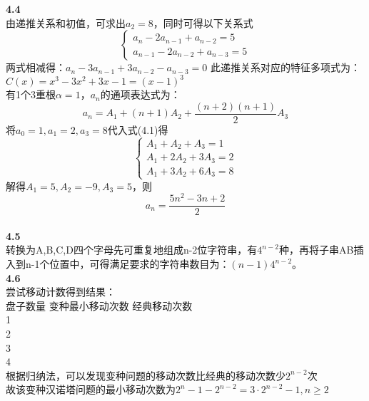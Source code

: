 \documentclass[a4paper,12pt]{article}
\begin{document}
	\noindent
	\textbf{4.4}\\
	由递推关系和初值，可求出$a_2=8$，同时可得以下关系式\\
	$$
	\begin{cases}
		a_{n}-2a_{n-1}+a_{n-2}=5\\
		a_{n-1}-2a_{n-2}+a_{n-3}=5
	\end{cases}
	$$
	两式相减得：$a_{n}-3a_{n-1}+3a_{n-2}-a_{n-3}=0$
	此递推关系对应的特征多项式为：$C(x)=x^3-3x^2+3x-1=(x-1)^3$\\
	有1个3重根$\alpha=1$，$a_{n}$的通项表达式为：\[
		a_{n}=A_{1}+(n+1)A_{2}+\frac{(n+2)(n+1)}{2}A_{3} \tag{4.1}
	\]
	将$a_0=1,a_1=2,a_3=8$代入式(4.1)得
	$$
	\begin{cases}
		A_{1}+A_{2}+A_{3}=1\\
		A_{1}+2A_{2}+3A_{3}=2\\
		A_{1}+3A_{2}+6A_{3}=8
	\end{cases}
	$$
	解得$A_{1}=5,A_{2}=-9,A_{3}=5$，则\[
		a_n=\frac{5n^2-3n+2}{2}
	\] 
	\\
	
	\noindent
	\textbf{4.5}\\
	转换为A,B,C,D四个字母先可重复地组成n-2位字符串，有$4^{n-2}$种，再将子串AB插入到n-1个位置中，可得满足要求的字符串数目为：$(n-1)4^{n-2}$。
	\\
	
	\noindent
	\textbf{4.6}\\
	尝试移动计数得到结果：\\
	盘子数量 \quad 变种最小移动次数 \quad 经典移动次数\\
	1	\qquad\qquad\qquad{}	\qquad\qquad\qquad\qquad 1 \\
	2	\qquad\qquad\qquad{}	\qquad\qquad\qquad\qquad 3 \\
	3	\qquad\qquad\qquad{}	\qquad\qquad\qquad\qquad 7 \\
	4	\qquad\qquad\qquad{}	\qquad\qquad\qquad{} \\
	根据归纳法，可以发现变种问题的移动次数比经典的移动次数少$2^{n-2}$次\\
	故该变种汉诺塔问题的最小移动次数为$2^{n}-1-2^{n-2}=3\cdot2^{n-2}-1,n\geq2$
	\\
	
\end{document}

